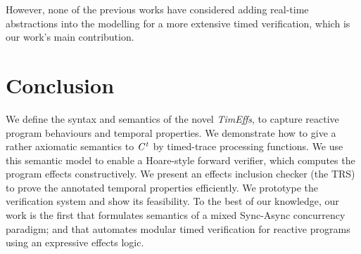 \documentclass[acmsmall,10pt,review]{acmart}
\newcommand{\timedEffects}{\emph{TimEffs}}
\newcommand{\code}[1]{{\tt{\ensuremath{\m{#1}}}}}
\newcommand{\m}{\mathit}
\newcommand{\timedL}{\code{C^{t}}}
\begin{document}
{However, none of the previous works have considered adding real-time abstractions into the modelling for a more extensive timed verification, which is our work's main contribution.




 
%
%
%
%
%
 






%
%


\section{Conclusion}
\label{sec:conclusion}
We define the syntax and semantics of the novel \timedEffects, to capture reactive program behaviours and  temporal properties. We demonstrate how to give a rather axiomatic semantics to \code{\timedL} by timed-trace processing functions. We use this semantic model to enable  a Hoare-style forward verifier,  which computes the program effects constructively.
We present an effects inclusion checker (the TRS) to prove the annotated temporal properties efficiently. We prototype the verification system and show its feasibility.
To the best of our knowledge, our work is the first that formulates semantics of a mixed Sync-Async concurrency paradigm; and that automates modular timed verification for reactive programs using an expressive effects logic. 


}
\end{document}
